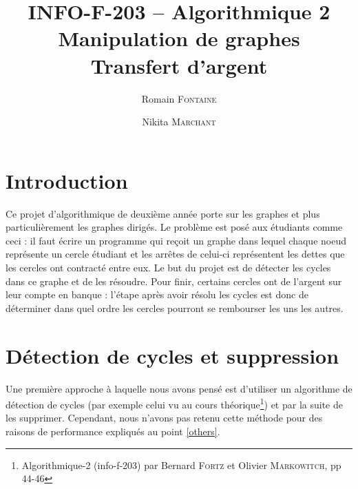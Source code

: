 \documentclass[12pt, oneside]{article}
\title{{\normalsize{INFO-F-203 -- Algorithmique 2}}\\Manipulation de graphes\\ Transfert d’argent}
\author{Romain \textsc{Fontaine} \and Nikita \textsc{Marchant}}
\begin{document}
\maketitle
\section{Introduction}
Ce projet d'algorithmique de deuxième année porte sur les graphes et plus particulièrement les graphes dirigés.
Le problème est posé aux étudiants comme ceci : il faut écrire un programme qui reçoit un graphe dans lequel chaque noeud représente un cercle étudiant et les arrêtes de celui-ci représentent les dettes que les cercles ont contracté entre eux. Le but du projet est de détecter les cycles dans ce graphe et de les résoudre.
Pour finir, certains cercles ont de l'argent sur leur compte en banque : l'étape après avoir résolu les cycles est donc de déterminer dans quel ordre les cercles pourront se rembourser les uns les autres.
\section{Détection de cycles et suppression}
Une première approche à laquelle nous avons pensé est d'utiliser un algorithme de détection de cycles (par exemple celui vu au cours théorique\footnote{Algorithmique-2 (info-f-203) par Bernard \textsc{Fortz} et Olivier \textsc{Markowitch}, pp 44-46}) et par la suite de les supprimer. Cependant, nous n'avons pas retenu cette méthode pour des raisons de performance expliqués au point \ref{others}.
\end{document}
